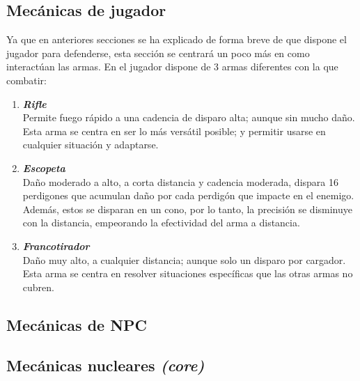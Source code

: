    \subsection{Mecánicas de jugador}
        Ya que en anteriores secciones se ha explicado de forma breve de que dispone el jugador para defenderse, esta sección se centrará un poco más en como interactúan las armas.
        En \gameTitle\xspace el jugador dispone de 3 armas diferentes con la que combatir:
            \begin{enumerate}
                \item \textbf{\textit{Rifle}} \\
                Permite fuego rápido a una cadencia de disparo alta; aunque sin mucho daño. Esta arma se centra en ser lo más versátil posible; y permitir usarse en cualquier situación y adaptarse.
                \item \textbf{\textit{Escopeta}} \\
                Daño moderado a alto, a corta distancia y cadencia moderada, dispara 16 perdigones que acumulan daño por cada perdigón que impacte en el enemigo. Además, estos se disparan en un cono, por lo tanto, la precisión se disminuye con la distancia, empeorando la efectividad del arma a distancia.
                \item \textbf{\textit{Francotirador}} \\
                Daño muy alto, a cualquier distancia; aunque solo un disparo por cargador. Esta arma se centra en resolver situaciones específicas que las otras armas no cubren.

            \end{enumerate}
    \subsection{Mecánicas de NPC}
    \subsection{Mecánicas nucleares \textit{(core)}}

    \newpage

